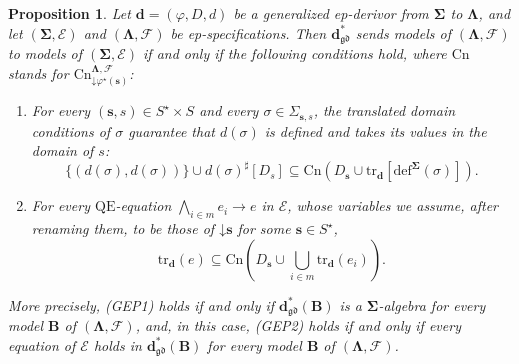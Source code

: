\documentclass{amsart}
\newcommand{\vs}[1]{\mathbin{\downarrow}#1}
\theoremstyle{plain}
\newtheorem{proposition}[theorem]{Proposition}
\theoremstyle{definition}
\begin{document}
\begin{proposition}\label{PGenEpDerivorAlg}
Let $\mathbf{d}=(\varphi,D,d)$ be a generalized ep-derivor from $\mathbf{\Sigma}$ to $\mathbf{\Lambda}$, and let $(\mathbf{\Sigma},\mathcal{E})$ and $(\mathbf{\Lambda},\mathcal{F})$ be ep-specifications. Then $\mathbf{d}^{\ast}_{\mathfrak{gd}}$ sends models of $(\mathbf{\Lambda},\mathcal{F})$ to models of $(\mathbf{\Sigma},\mathcal{E})$ if and only if the following conditions hold, where $\mathrm{Cn}$ stands for $\mathrm{Cn}^{\mathbf{\Lambda},\mathcal{F}}_{\vs{\varphi^{\star}(\mathbf{s})}}$:
\begin{enumerate}
\item[(GEP1)] For every $(\mathbf{s},s)\in S^{\star}\times S$ and every $\sigma\in\Sigma_{\mathbf{s},s}$, the translated domain conditions of $\sigma$ guarantee that $d(\sigma)$ is defined and takes its values in the domain of $s$:
$$
\{(d(\sigma),d(\sigma))\}\cup d(\sigma)^{\sharp}[D_{s}]\subseteq
\mathrm{Cn}\left(D_{\mathbf{s}}\cup\mathrm{tr}_{\mathbf{d}}[\mathrm{def}^{\mathbf{\Sigma}}(\sigma)]\right).
$$
\item[(GEP2)] For every $\mathrm{QE}$-equation $\bigwedge_{i\in m}e_{i}\longrightarrow e$ in $\mathcal{E}$, whose variables we assume, after renaming them, to be those of $\vs{\mathbf{s}}$ for some $\mathbf{s}\in S^{\star}$,
$$
\textstyle
\mathrm{tr}_{\mathbf{d}}(e)\subseteq\mathrm{Cn}\left(D_{\mathbf{s}}\cup\bigcup_{i\in m}\mathrm{tr}_{\mathbf{d}}(e_{i})\right).
$$
\end{enumerate}
More precisely, (GEP1) holds if and only if $\mathbf{d}^{\ast}_{\mathfrak{gd}}(\mathbf{B})$ is a $\mathbf{\Sigma}$-algebra for every model $\mathbf{B}$ of $(\mathbf{\Lambda},\mathcal{F})$, and, in this case, (GEP2) holds if and only if every equation of $\mathcal{E}$ holds in $\mathbf{d}^{\ast}_{\mathfrak{gd}}(\mathbf{B})$ for every model $\mathbf{B}$ of $(\mathbf{\Lambda},\mathcal{F})$.
\end{proposition}
\end{document}
